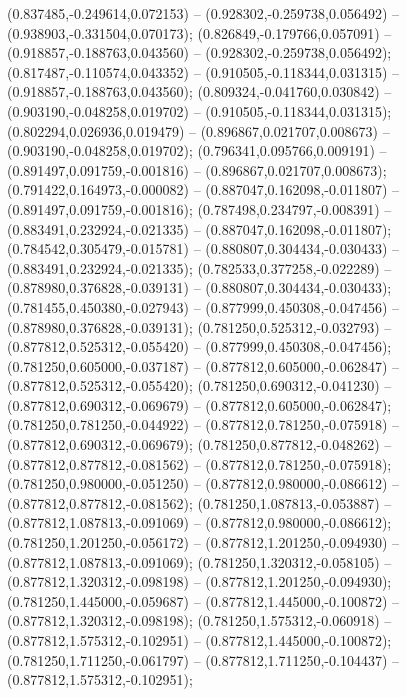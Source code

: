  (0.837485,-0.249614,0.072153) -- (0.928302,-0.259738,0.056492) -- (0.938903,-0.331504,0.070173);
 (0.826849,-0.179766,0.057091) -- (0.918857,-0.188763,0.043560) -- (0.928302,-0.259738,0.056492);
 (0.817487,-0.110574,0.043352) -- (0.910505,-0.118344,0.031315) -- (0.918857,-0.188763,0.043560);
 (0.809324,-0.041760,0.030842) -- (0.903190,-0.048258,0.019702) -- (0.910505,-0.118344,0.031315);
 (0.802294,0.026936,0.019479) -- (0.896867,0.021707,0.008673) -- (0.903190,-0.048258,0.019702);
 (0.796341,0.095766,0.009191) -- (0.891497,0.091759,-0.001816) -- (0.896867,0.021707,0.008673);
 (0.791422,0.164973,-0.000082) -- (0.887047,0.162098,-0.011807) -- (0.891497,0.091759,-0.001816);
 (0.787498,0.234797,-0.008391) -- (0.883491,0.232924,-0.021335) -- (0.887047,0.162098,-0.011807);
 (0.784542,0.305479,-0.015781) -- (0.880807,0.304434,-0.030433) -- (0.883491,0.232924,-0.021335);
 (0.782533,0.377258,-0.022289) -- (0.878980,0.376828,-0.039131) -- (0.880807,0.304434,-0.030433);
 (0.781455,0.450380,-0.027943) -- (0.877999,0.450308,-0.047456) -- (0.878980,0.376828,-0.039131);
 (0.781250,0.525312,-0.032793) -- (0.877812,0.525312,-0.055420) -- (0.877999,0.450308,-0.047456);
 (0.781250,0.605000,-0.037187) -- (0.877812,0.605000,-0.062847) -- (0.877812,0.525312,-0.055420);
 (0.781250,0.690312,-0.041230) -- (0.877812,0.690312,-0.069679) -- (0.877812,0.605000,-0.062847);
 (0.781250,0.781250,-0.044922) -- (0.877812,0.781250,-0.075918) -- (0.877812,0.690312,-0.069679);
 (0.781250,0.877812,-0.048262) -- (0.877812,0.877812,-0.081562) -- (0.877812,0.781250,-0.075918);
 (0.781250,0.980000,-0.051250) -- (0.877812,0.980000,-0.086612) -- (0.877812,0.877812,-0.081562);
 (0.781250,1.087813,-0.053887) -- (0.877812,1.087813,-0.091069) -- (0.877812,0.980000,-0.086612);
 (0.781250,1.201250,-0.056172) -- (0.877812,1.201250,-0.094930) -- (0.877812,1.087813,-0.091069);
 (0.781250,1.320312,-0.058105) -- (0.877812,1.320312,-0.098198) -- (0.877812,1.201250,-0.094930);
 (0.781250,1.445000,-0.059687) -- (0.877812,1.445000,-0.100872) -- (0.877812,1.320312,-0.098198);
 (0.781250,1.575312,-0.060918) -- (0.877812,1.575312,-0.102951) -- (0.877812,1.445000,-0.100872);
 (0.781250,1.711250,-0.061797) -- (0.877812,1.711250,-0.104437) -- (0.877812,1.575312,-0.102951);
